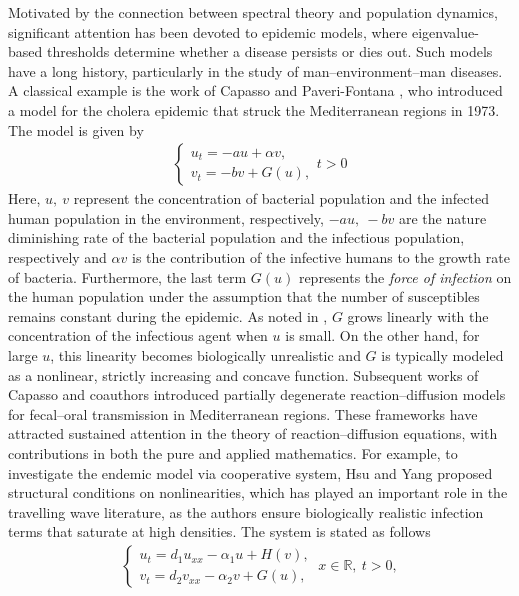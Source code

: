 \documentclass[a4paper,11pt]{amsart}
\theoremstyle{definition}
\def\R{\mathbb{R}}
\numberwithin{equation}{section}
\theoremstyle{definition}
\begin{document}
Motivated by the connection between spectral theory and population dynamics, significant attention has been devoted to epidemic models, where eigenvalue-based thresholds determine whether a disease persists or dies out. Such models have a long history, particularly in the study of man–environment–man diseases. A classical example is the work of Capasso and Paveri-Fontana \cite{capasso_paveri_1979}, who introduced a model for the cholera epidemic that struck the Mediterranean regions in 1973. The model is given by
\begin{align*}
\left\{\begin{array}{llll}
u_t=-au+\alpha v,\\
v_t=-bv+G(u),
\end{array}\right. t>0
\end{align*}
Here, $u,~v$ represent the concentration of bacterial population  and the infected human population in the environment, respectively, $-au,~-bv$ are the nature diminishing rate of the bacterial population and the infectious population, respectively and $\alpha v$ is the contribution of the infective humans to the growth rate of bacteria. Furthermore, the last term $G(u)$ represents the \textit{force of infection} on the human population under the assumption that the number of susceptibles remains constant during the epidemic. As noted in \cite{cantrell_schmitt_1986}, $G$ grows linearly with the concentration of the infectious agent when $u$ is small. On the other hand, for large $u$, this linearity becomes biologically unrealistic and $G$ is typically modeled as a nonlinear, strictly increasing and concave function. Subsequent works of Capasso and coauthors \cite{capasso_maddalena_1981,capasso_wilson_1997} introduced partially degenerate reaction–diffusion models for fecal–oral transmission in Mediterranean regions. These frameworks have attracted sustained attention in the theory of reaction–diffusion equations, with contributions in both the pure and applied mathematics. For example, to investigate the endemic model via cooperative system, Hsu and Yang \cite{hsu_existence_2013} proposed structural conditions on nonlinearities, which has played an important role in the travelling wave literature, as the authors ensure biologically realistic infection terms that saturate at high densities. The system is stated as follows
\begin{align*}
\left\{\begin{array}{llll}
u_t = d_1 u_{xx} - \alpha_1 u + H(v), \\
v_t = d_2 v_{xx} - \alpha_2 v + G(u),
\end{array}\right.~x\in \R,~t>0,
\end{align*}
\end{document}
